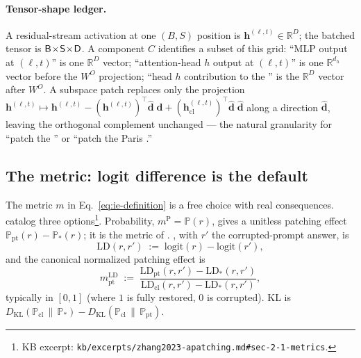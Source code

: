 \paragraph{Tensor-shape ledger.} A residual-stream activation at one
$(B, S)$ position is $\mathbf{h}^{(\ell, t)} \in \mathbb{R}^{D}$; the
batched tensor is $\mathsf{B}\!\times\!\mathsf{S}\!\times\!\mathsf{D}$. A
component $C$ identifies a subset of this grid: ``MLP output at
$(\ell, t)$'' is one $\mathbb{R}^{D}$ vector; ``attention-head $h$
output at $(\ell, t)$'' is one $\mathbb{R}^{d_h}$ vector before the
$W^O$ projection; ``head $h$ contribution to the '' is
the $\mathbb{R}^{D}$ vector after $W^O$. A subspace patch replaces only
the projection
$\mathbf{h}^{(\ell, t)} \mapsto \mathbf{h}^{(\ell, t)} -
(\mathbf{h}^{(\ell, t)})^{\top}\hat{\mathbf{d}}\;\hat{\mathbf{d}} +
(\mathbf{h}_{\text{cl}}^{(\ell, t)})^{\top}\hat{\mathbf{d}}\;
\hat{\mathbf{d}}$ along a  direction $\hat{\mathbf{d}}$, leaving
the orthogonal complement unchanged --- the natural granularity for
``patch the '' or ``patch the Paris .''

\subsection{The metric: logit difference is the default}
\label{sec:patching-metric}

The metric $m$ in Eq.~\eqref{eq:ie-definition} is a free choice with
real consequences. \citet[\S 2.1]{zhang2023-apatching} catalog three
options\footnote{KB excerpt:
\texttt{kb/excerpts/zhang2023-apatching.md\#sec-2-1-metrics}.}.
Probability, $m^{\mathrm{P}} = \mathbb{P}(r)$, gives a unitless
patching effect $\mathbb{P}_{\text{pt}}(r) - \mathbb{P}_{*}(r)$; it is
the metric of \citet{meng2022-rome}. , with $r'$ the
corrupted-prompt answer, is
\begin{equation}
  \mathrm{LD}(r, r') \;:=\; \mathrm{logit}(r) - \mathrm{logit}(r'),
  \label{eq:logit-diff}
\end{equation}
and the canonical normalized patching effect is
\citep[\S 2.1]{zhang2023-apatching}
\begin{equation}
  m^{\mathrm{LD}}_{\text{pt}} \;:=\;
  \frac{\mathrm{LD}_{\text{pt}}(r, r') - \mathrm{LD}_{*}(r, r')}{
        \mathrm{LD}_{\text{cl}}(r, r') - \mathrm{LD}_{*}(r, r')},
  \label{eq:logit-diff-normalized}
\end{equation}
typically in $[0, 1]$ (where $1$ is fully restored, $0$ is corrupted).
KL is
$D_{\mathrm{KL}}(\mathbb{P}_{\text{cl}} \,\|\, \mathbb{P}_{*}) -
 D_{\mathrm{KL}}(\mathbb{P}_{\text{cl}} \,\|\, \mathbb{P}_{\text{pt}})$.

